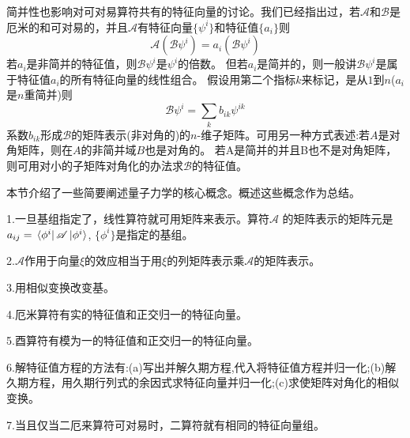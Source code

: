 简并性也影响对可对易算符共有的特征向量的讨论。我们已经指出过，若$\mathscr{A}$和$\mathscr{B}$是厄米的和可对易的，并且$\mathscr{A}$有特征向量$\{\psi^i\}$和特征值$\{a_i\}$则
\[\mathscr{A}(\mathscr{B}\psi^i)=a_i(\mathscr{B}\psi^i) \tag{3-88}\]
若$a_i$是非简并的特征值，则$\mathscr{B}\psi^i$是$\psi^i$的倍数。
但若$a_i$是简并的，则一般讲$\mathscr{B}\psi^i$是属于特征值$a_i$的所有特征向量的线性组合。
假设用第二个指标$k$来标记，是从$1$到$n$($a_i$是$n$重简并)则
\[\mathscr{B}\psi^i=\sum_kb_{ik}\psi^{ik} \tag{3-96}\]
系数$b_{ik}$形成$\mathscr{B}$的矩阵表示(非对角的)的$n$-维子矩阵。可用另一种方式表述:若$A$是对角矩阵，则在$A$的非简并域$B$也是对角的。
若A是简并的并且B也不是对角矩阵，则可用对小的子矩阵对角化的办法求$\mathscr{B}$的特征值。

本节介绍了一些简要阐述量子力学的核心概念。概述这些概念作为总结。

1.一旦基组指定了，线性算符就可用矩阵来表示。算符$\mathscr{A}$ 
的矩阵表示的矩阵元是$a_{ij}=\bra*{\phi^i}\mathscr{A}\ket*{\phi^i}$, $\{\phi^i\}$是指定的基组。

2.$\mathscr{A}$作用于向量$\xi$的效应相当于用$\xi$的列矩阵表示乘$\mathscr{A}$的矩阵表示。

3.用相似变换改变基。

4.厄米算符有实的特征值和正交归一的特征向量。

5.酉算符有模为一的特征值和正交归一的特征向量。

6.解特征值方程的方法有:(a)写出并解久期方程,代入将特征值方程并归一化;(b)解久期方程，用久期行列式的余因式求特征向量并归一化;(c)求使矩阵对角化的相似变换。

7.当且仅当二厄来算符可对易时，二算符就有相同的特征向量组。

